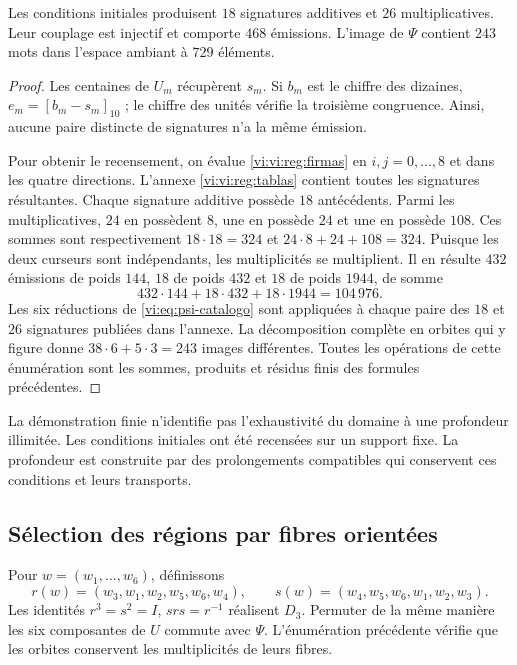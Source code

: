 \begin{proposition}
\label{vi:vi:reg:censo}
Les conditions initiales produisent \(18\) signatures additives et \(26\)
multiplicatives. Leur couplage est injectif et comporte \(468\)
émissions. L’image de \(\Psi\) contient \(243\) mots dans
l’espace ambiant à \(729\) éléments.
\end{proposition}
\begin{proof}
Les centaines de \(U_m\) récupèrent \(s_m\). Si \(b_m\) est le
chiffre des dizaines, \(e_m=[b_m-s_m]_{10}\) ; le chiffre des unités
vérifie la troisième congruence. Ainsi, aucune paire distincte
de signatures n’a la même émission.

Pour obtenir le recensement, on évalue \eqref{vi:vi:reg:firmas} en
\(i,j=0,\ldots,8\) et dans les quatre directions. L’annexe
\ref{vi:vi:reg:tablas} contient toutes les signatures résultantes. Chaque
signature additive possède \(18\) antécédents. Parmi les multiplicatives,
\(24\) en possèdent \(8\), une en possède \(24\) et une en possède \(108\).
Ces sommes sont respectivement \(18\cdot18=324\) et
\(24\cdot8+24+108=324\). Puisque les deux curseurs sont
indépendants, les multiplicités se multiplient. Il en résulte
\(432\) émissions de poids \(144\), \(18\) de poids \(432\) et
\(18\) de poids \(1944\), de somme
\[
 432\cdot144+18\cdot432+18\cdot1944=104\,976.
\]
Les six réductions de \eqref{vi:eq:psi-catalogo} sont appliquées à chaque paire
des \(18\) et \(26\) signatures publiées dans l'annexe. La
décomposition complète en orbites qui y figure donne
\(38\cdot6+5\cdot3=243\) images différentes. Toutes les
opérations de cette énumération sont les sommes, produits et résidus
finis des formules précédentes.
\end{proof}

La démonstration finie n’identifie pas l’exhaustivité du domaine à une
profondeur illimitée. Les conditions initiales ont été recensées sur
un support fixe. La profondeur est construite par des prolongements
compatibles qui conservent ces conditions et leurs transports.

\subsection{Sélection des régions par fibres orientées}

Pour \(w=(w_1,\ldots,w_6)\), définissons
\[
 r(w)=(w_3,w_1,w_2,w_5,w_6,w_4),\qquad
 s(w)=(w_4,w_5,w_6,w_1,w_2,w_3).
\]
Les identités \(r^3=s^2=I\), \(srs=r^{-1}\) réalisent
\(D_3\). Permuter de la même manière les six composantes de \(U\)
commute avec \(\Psi\). L’énumération précédente vérifie que les
orbites conservent les multiplicités de leurs fibres.

